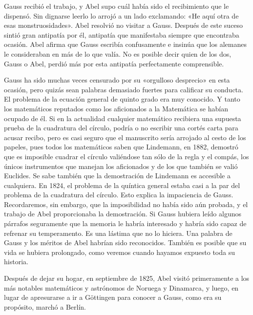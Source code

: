\documentclass[a4paper, 12pt, draft]{article}
\begin{document}
Gauss recibió el trabajo, y Abel supo cuál había sido el recibimiento que le dispensó. Sin dignarse leerlo lo arrojó a un lado exclamando: «He aquí otra de esas monstruosidades». Abel resolvió no visitar a Gauss. Después de este suceso sintió gran antipatía por él, antipatía que manifestaba siempre que encontraba ocasión. Abel afirma que Gauss escribía confusamente e insinúa que los alemanes le consideraban en más de lo que valía. No es posible decir quien de los dos, Gauss o Abel, perdió más por esta antipatía perfectamente comprensible.

Gauss ha sido muchas veces censurado por su «orgulloso desprecio» en esta ocasión, pero quizás sean palabras demasiado fuertes para calificar su conducta. El problema de la ecuación general de quinto grado era muy conocido. Y tanto los matemáticos reputados como los aficionados a la Matemática se habían ocupado de él. Si en la actualidad cualquier matemático recibiera una supuesta prueba de la cuadratura del círculo, podría o no escribir una cortés carta para acusar recibo, pero es casi seguro que el manuscrito sería arrojado al cesto de los papeles, pues todos los matemáticos saben que Lindemann, en 1882, demostró que es imposible cuadrar el círculo valiéndose tan sólo de la regla y el compás, los únicos instrumentos que manejan los aficionados y de los que también se valió Euclides. Se sabe también que la demostración de Lindemann es accesible a cualquiera. En 1824, el problema de la quíntica general estaba casi a la par del problema de la cuadratura del círculo. Esto explica la impaciencia de Gauss. Recordaremos, sin embargo, que la imposibilidad no había sido aún probada, y el trabajo de Abel proporcionaba la demostración. Si Gauss hubiera leído algunos párrafos seguramente que la memoria le habría interesado y habría sido capaz de refrenar su temperamento. Es una lástima que no lo hiciera. Una palabra de Gauss y los méritos de Abel habrían sido reconocidos. También es posible que su vida se hubiera prolongado, como veremos cuando hayamos expuesto toda su historia.

Después de dejar su hogar, en septiembre de 1825, Abel visitó primeramente a los más notables matemáticos y astrónomos de Noruega y Dinamarca, y luego, en lugar de apresurarse a ir a Göttingen para conocer a Gauss, como era su propósito, marchó a Berlín.
\end{document}
